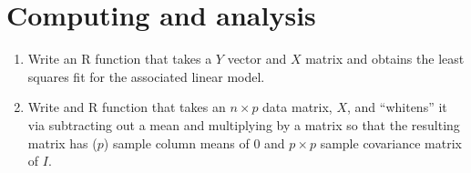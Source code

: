 \documentclass[12pt]{article}
\begin{document}
\section{Computing and analysis}
\begin{enumerate}[1.]
\item Write an R function that takes a $Y$ vector and $X$ matrix and obtains
the least squares fit for the associated linear model.
\item Write and R function that takes an $n\times p$ data matrix, $X$, and
	``whitens'' it via subtracting out a mean and multiplying by a matrix
	so that the resulting matrix has ($p$) sample column means of 0 and
	$p\times p$ sample covariance matrix of $I$.
\end{enumerate}
\end{document}
